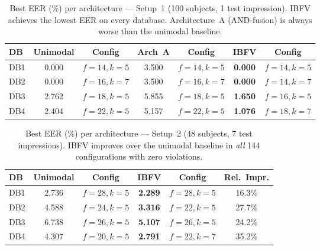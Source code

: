 
\begin{table}[t]
\centering
\caption{Best EER (\%) per architecture — Setup~1 (100 subjects, 1 test impression).
IBFV achieves the lowest EER on every database. Architecture~A (AND-fusion) is always worse than the unimodal baseline.}
\label{tab:setup1}
\begin{tabular}{lcccccc}
\toprule
DB & Unimodal & Config & Arch~A & Config & \textbf{IBFV} & Config \\
\midrule
DB1 & 0.000 & $f\!=\!14, k\!=\!5$ & 3.500 & $f\!=\!14, k\!=\!5$ & \textbf{0.000} & $f\!=\!14, k\!=\!5$ \\
DB2 & 0.000 & $f\!=\!16, k\!=\!7$ & 3.500 & $f\!=\!16, k\!=\!7$ & \textbf{0.000} & $f\!=\!14, k\!=\!7$ \\
DB3 & 2.762 & $f\!=\!18, k\!=\!5$ & 5.855 & $f\!=\!18, k\!=\!5$ & \textbf{1.650} & $f\!=\!16, k\!=\!5$ \\
DB4 & 2.404 & $f\!=\!22, k\!=\!5$ & 5.157 & $f\!=\!22, k\!=\!5$ & \textbf{1.076} & $f\!=\!18, k\!=\!7$ \\
\bottomrule
\end{tabular}
\end{table}

\begin{table}[t]
\centering
\caption{Best EER (\%) per architecture — Setup~2 (48 subjects, 7 test impressions).
IBFV improves over the unimodal baseline in \emph{all} 144 configurations with zero violations.}
\label{tab:setup2}
\begin{tabular}{lccccc}
\toprule
DB & Unimodal & Config & \textbf{IBFV} & Config & Rel.\ Impr. \\
\midrule
DB1 & 2.736 & $f\!=\!28, k\!=\!5$ & \textbf{2.289} & $f\!=\!28, k\!=\!5$ & 16.3\% \\
DB2 & 4.588 & $f\!=\!24, k\!=\!5$ & \textbf{3.316} & $f\!=\!22, k\!=\!5$ & 27.7\% \\
DB3 & 6.738 & $f\!=\!26, k\!=\!5$ & \textbf{5.107} & $f\!=\!26, k\!=\!5$ & 24.2\% \\
DB4 & 4.307 & $f\!=\!20, k\!=\!5$ & \textbf{2.791} & $f\!=\!22, k\!=\!7$ & 35.2\% \\
\bottomrule
\end{tabular}
\end{table}

